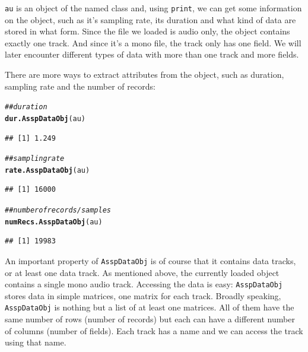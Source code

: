 \documentclass[11pt]{article}\usepackage[]{graphicx}\usepackage[]{color}
\makeatletter
\newcommand{\hlcom}[1]{\textcolor[rgb]{0.4,0.4,0.4}{\textit{#1}}}%
\newcommand{\hlkwd}[1]{\textcolor[rgb]{0,0,0}{\textbf{#1}}}%
\newenvironment{kframe}{%
 \def\at@end@of@kframe{}%
 \ifinner\ifhmode%
  \def\at@end@of@kframe{\end{minipage}}%
  \begin{minipage}{\columnwidth}%
 \fi\fi%
 \def\FrameCommand##1{\hskip\@totalleftmargin \hskip-\fboxsep
 \colorbox{shadecolor}{##1}\hskip-\fboxsep
     \hskip-\linewidth \hskip-\@totalleftmargin \hskip\columnwidth}%
 \MakeFramed {\advance\hsize-\width
   \@totalleftmargin\z@ \linewidth\hsize
   \@setminipage}}%
 {\par\unskip\endMakeFramed%
 \at@end@of@kframe}
\newenvironment{knitrout}{}{} %
\makeatother
\begin{document}
\verb|au| is an object of the named class and, using \verb|print|, we can get some information on the object, such as it's sampling rate, its duration and what kind of data are stored in what form. Since the file we loaded is audio only, the object contains exactly one track. And since it's a mono file, the track only has one field. We will later encounter different types of data with more than one track and more fields.

There are more ways to extract attributes from the object, such as duration, sampling rate and the number of records:

\begin{knitrout}\footnotesize
{}\color{fgcolor}\begin{kframe}
\begin{alltt}
\hlcom{## duration}
\hlkwd{dur.AsspDataObj}(au)
\end{alltt}
\begin{verbatim}
## [1] 1.249
\end{verbatim}
\begin{alltt}
\hlcom{## sampling rate}
\hlkwd{rate.AsspDataObj}(au)
\end{alltt}
\begin{verbatim}
## [1] 16000
\end{verbatim}
\begin{alltt}
\hlcom{## number of records/samples}
\hlkwd{numRecs.AsspDataObj}(au)
\end{alltt}
\begin{verbatim}
## [1] 19983
\end{verbatim}
\end{kframe}
\end{knitrout}


An important property of \verb|AsspDataObj| is of course that it
contains data tracks, or at least one data track. As mentioned above,
the currently loaded object contains a single mono audio
track. Accessing the data is easy: \verb|AsspDataObj| stores data in
simple matrices, one matrix for each track. Broadly speaking,
\verb|AsspDataObj| is nothing but a list of at least one matrices. All
of them have the same number of rows (number of records) but each can
have a different number of columns (number of fields). Each track has
a name and we can access the track using that name.
\end{document}
